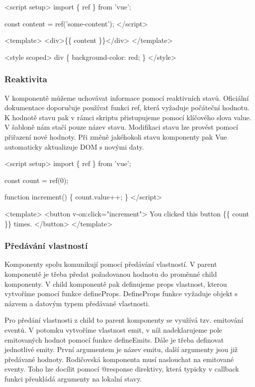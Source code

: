 \begin{prog}
<script setup>
  import \{ ref \} from 'vue';
  
  const content = ref('some-content');
</script>
  
<template>
  <div>\{\{ content \}\}</div>
</template>
  
<style scoped>
  div \{
    background-color: red;
  \}
</style>
\end{prog}

\subsubsection{Reaktivita}

V komponentě můžeme uchovávat informace pomocí reaktivních stavů. Oficiální dokumentace doporučuje používat funkci ref, která vyžaduje počáteční hodnotu. 
K hodnotě stavu pak v rámci skriptu přistupujeme pomocí klíčového slova value. V šabloně nám stačí pouze název stavu. 
Modifikaci stavu lze provést pomocí přiřazení nové hodnoty. Při změně jakéhokoli stavu komponenty pak Vue automaticky aktualizuje DOM s novými daty.\cite{vue}

\begin{prog}
<script setup>
  import \{ ref \} from 'vue';
  
  const count = ref(0);

  function increment() \{
    count.value++;
  \}
</script>
  
<template>
  <button v-on:click="increment">
    You clicked this button \{\{ count \}\} times.
  </button>
</template>
\end{prog}

\subsubsection{Předávání vlastností}

Komponenty spolu komunikují pomocí předávání vlastností. V parent komponentě je třeba předat požadovanou hodnotu do proměnné child komponenty. 
V child komponentě pak definujeme props vlastnost, kterou vytvoříme pomocí funkce defineProps. 
DefineProps funkce vyžaduje objekt s názvem a datovým typem předávané vlastnosti.

Pro předání vlastnosti z child to parent komponenty se využívá tzv. emitování eventů. 
V potomku vytvoříme vlastnost emit, v níž nadeklarujeme pole emitovaných hodnot pomocí funkce defineEmits. Dále je třeba definovat jednotlivé emity. 
První argumentem je název emitu, další argumenty jsou již předávané hodnoty. Rodičovská komponenta musí naslouchat na emitované eventy. 
Toho lze docílit pomocí @response direktivy, která typicky v callback funkci přeukládá argumenty na lokalní stavy.\cite{vuemacrae,vue}

